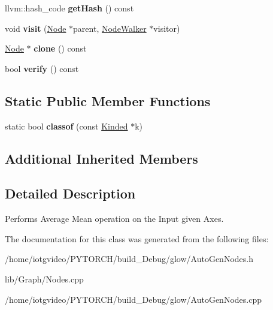 \begin{DoxyCompactItemize}
llvm\+::hash\+\_\+code {\bfseries get\+Hash} () const
\item 
\mbox{\label{classglow_1_1_batched_reduce_mean_node_a986c5fcf13094ba2650a2ac5b453ed38}} 
void {\bfseries visit} (\hyperlink{classglow_1_1_node}{Node} $\ast$parent, \hyperlink{classglow_1_1_node_walker}{Node\+Walker} $\ast$visitor)
\item 
\mbox{\label{classglow_1_1_batched_reduce_mean_node_a9a985f46829bf598760f6585d1d6dd7d}} 
\hyperlink{classglow_1_1_node}{Node} $\ast$ {\bfseries clone} () const
\item 
\mbox{\label{classglow_1_1_batched_reduce_mean_node_a5dd3d8bd416207efdec404714a10d34e}} 
bool {\bfseries verify} () const
\end{DoxyCompactItemize}
\subsection*{Static Public Member Functions}
\begin{DoxyCompactItemize}
\item 
\mbox{\label{classglow_1_1_batched_reduce_mean_node_ae9b3eeb581bdb56ef21748292435a30f}} 
static bool {\bfseries classof} (const \hyperlink{classglow_1_1_kinded}{Kinded} $\ast$k)
\end{DoxyCompactItemize}
\subsection*{Additional Inherited Members}


\subsection{Detailed Description}
Performs Average Mean operation on the Input given Axes. 

The documentation for this class was generated from the following files\+:\begin{DoxyCompactItemize}
\item 
/home/iotgvideo/\+P\+Y\+T\+O\+R\+C\+H/build\+\_\+\+Debug/glow/Auto\+Gen\+Nodes.\+h\item 
lib/\+Graph/Nodes.\+cpp\item 
/home/iotgvideo/\+P\+Y\+T\+O\+R\+C\+H/build\+\_\+\+Debug/glow/Auto\+Gen\+Nodes.\+cpp\end{DoxyCompactItemize}
